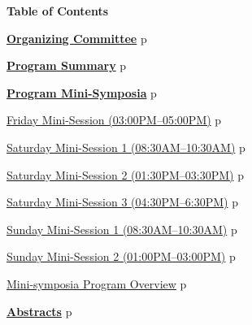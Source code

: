 \newpage\newpage
\thispagestyle{empty}
\newpage
\clearpage


\thispagestyle{empty}
\centerline{\bfseries\Large Table of Contents}
\vspace{4ex}

\noindent
\hyperref[committee]{{\bfseries\large  Organizing Committee}}%
\dotfill{}p\pageref{committee}
\vspace{3ex}

\noindent
\hyperref[programsummary]{{\bfseries\large  Program Summary}}%
\dotfill{}p\pageref{programsummary}
\vspace{3ex}

\noindent
\hyperref[program]{{\bfseries\large  Program Mini-Symposia}}%
\dotfill{}p\pageref{program}
\vspace{2ex}

\noindent\quad\hyperref[mini-friday]{{\large Friday Mini-Session (03:00PM--05:00PM)}}%
\dotfill{}p\pageref{mini-friday}
\vspace{2ex}

\noindent\quad\hyperref[mini-saturday1]{{\large Saturday Mini-Session 1 (08:30AM--10:30AM)}}%
\dotfill{}p\pageref{mini-saturday1}
\vspace{1ex}

\noindent\quad\hyperref[mini-saturday2]{{\large Saturday Mini-Session 2 (01:30PM--03:30PM)}}%
\dotfill{}p\pageref{mini-saturday2}
\vspace{1ex}

\noindent\quad\hyperref[mini-saturday3]{{\large Saturday Mini-Session 3 (04:30PM--6:30PM)}}%
\dotfill{}p\pageref{mini-saturday3}
\vspace{2ex}

\noindent\quad\hyperref[mini-sunday1]{{\large Sunday Mini-Session 1 (08:30AM--10:30AM)}}
\dotfill{}p\pageref{mini-sunday1}
\vspace{1ex}

\noindent\quad\hyperref[mini-sunday2]{{\large Sunday Mini-Session 2 (01:00PM--03:00PM)}}%
\dotfill{}p\pageref{mini-sunday2}
\vspace{3ex}

\noindent\quad\hyperref[prog-overview]{{\large Mini-symposia Program Overview}}%
\dotfill{}p\pageref{prog-overview}
\vspace{3ex}

\noindent\hyperref[abstracts]{{\bfseries\large Abstracts}}%
\dotfill{}p\pageref{abstracts}
\vspace{2ex}

